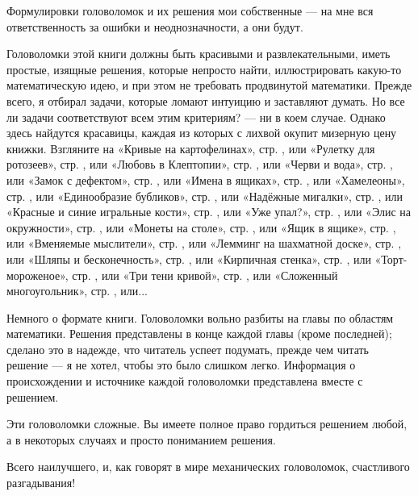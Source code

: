 Формулировки головоломок и их решения мои собственные --- на мне вся ответственность за ошибки и неоднозначности, а они будут.

Головоломки этой книги должны быть красивыми и развлекательными,
иметь простые, изящные решения, которые непросто найти,
иллюстрировать какую-то математическую идею,
и при этом не требовать продвинутой математики.
Прежде всего, я отбирал задачи, которые ломают интуицию и заставляют думать.
Но все ли задачи соответствуют всем этим критериям? --- ни в коем случае.
Однако здесь найдутся красавицы, каждая из которых с лихвой окупит мизерную цену книжки.
Взгляните на
«Кривые на картофелинах», стр. \pageref{Кривые на картофелинах}, или
«Рулетку для ротозеев», стр. \pageref{Рулетка для ротозеев}, или
«Любовь в Клептопии», стр. \pageref{Любовь в Клептопии}, или
«Черви и вода», стр. \pageref{Черви и вода}, или
«Замок с дефектом», стр. \pageref{Замок с дефектом}, или
«Имена в ящиках», стр. \pageref{Имена в ящиках}, или
«Хамелеоны», стр. \pageref{Хамелеоны}, или
«Единообразие бубликов», стр. \pageref{Единообразие бубликов}, или
«Надёжные мигалки», стр. \pageref{Надёжные мигалки}, или
«Красные и синие игральные кости», стр. \pageref{Красные и синие игральные кости}, или
«Уже упал?», стр. \pageref{Уже упал?}, или
«Элис на окружности», стр. \pageref{Элис на окружности}, или
«Монеты на столе», стр. \pageref{Монеты на столе}, или
«Ящик в ящике», стр. \pageref{Ящик в ящике}, или
«Вменяемые мыслители», стр. \pageref{Вменяемые мыслители}, или
«Лемминг на шахматной доске», стр. \pageref{Лемминг на шахматной доске}, или
«Шляпы и бесконечность», стр. \pageref{Шляпы и бесконечность}, или
«Кирпичная стенка», стр. \pageref{Кирпичная стенка}, или
«Торт-мороженое», стр. \pageref{Торт-мороженое}, или
«Три тени кривой», стр. \pageref{Три тени кривой}, или
«Сложенный многоугольник», стр. \pageref{Сложенный многоугольник}, или...

Немного о формате книги.
Головоломки вольно разбиты на главы по областям математики.
Решения представлены в конце каждой главы (кроме последней);
сделано это в надежде, что читатель успеет подумать, прежде чем читать решение --- я не хотел, чтобы это было слишком легко.
Информация о происхождении и источнике каждой головоломки представлена вместе с решением.

Эти головоломки сложные.
Вы имеете полное право гордиться решением любой, а в некоторых случаях и просто пониманием решения.

Всего наилучшего, и, как говорят в мире механических головоломок, счастливого разгадывания!

